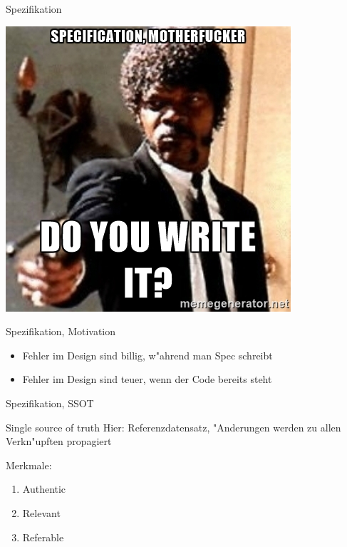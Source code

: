 \documentclass{beamer}
\begin{document}
\begin{frame}{Spezifikation}
	\begin{center}
		\includegraphics[scale=.5]{spec-do-you-write-it.jpg}
	\end{center}
\end{frame}

\begin{frame}{Spezifikation, Motivation}
	\begin{itemize}
		\item Fehler im Design sind billig, w"ahrend man Spec schreibt
		\item Fehler im Design sind teuer, wenn der Code bereits steht
	\end{itemize}
\end{frame}

\begin{frame}{Spezifikation, SSOT}
	\begin{block}{Single source of truth}
		Hier: Referenzdatensatz, "Anderungen werden zu allen Verkn"upften propagiert
	\end{block}
	
	Merkmale:
	\begin{enumerate}
		\item Authentic
		\item Relevant
		\item Referable
	\end{enumerate}
\end{frame}
\end{document}
